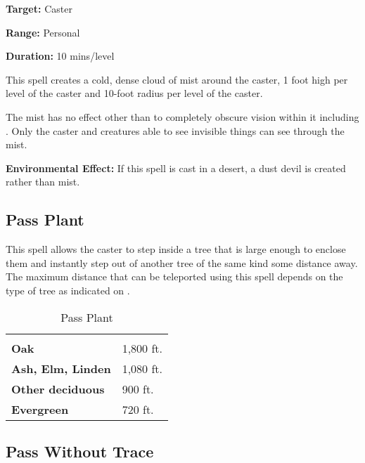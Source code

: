 \begin{multicols*}{2}
{\textbf{Target:} Caster

\textbf{Range:} Personal

\textbf{Duration:} 10 mins/level}

This spell creates a cold, dense cloud of mist around the caster, 1 foot high per level of the caster and 10-foot radius per level of the caster.

The mist has no effect other than to completely obscure vision within it including . Only the caster and creatures able to see invisible things can see through the mist.

\textbf{Environmental Effect:} If this spell is cast in a desert, a dust devil is created rather than mist.

\subsection{Pass Plant}\label{spell:Pass Plant}

This spell allows the caster to step inside a tree that is large enough to enclose them and instantly step out of another tree of the same kind some distance away. The maximum distance that can be teleported using this spell depends on the type of tree as indicated on .

\begin {table}[H]
\caption{Pass Plant}\label{tab:Pass Plant}
  \begin{tabularx}{\columnwidth}{>{\bfseries}YY}
	 & \\
	Oak & 1,800 ft.\\
	Ash, Elm, Linden & 1,080 ft.\\
	Other deciduous & 900 ft.\\
	Evergreen & 720 ft.
  \end {tabularx}
\end {table}

\subsection{Pass Without Trace}\label{spell:Pass Without Trace}
\end{multicols*}
